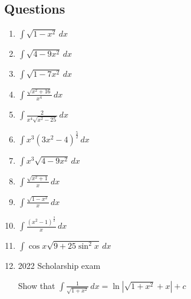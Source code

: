 \documentclass[../main.tex]{subfiles}
\begin{document}
    
\pagebreak

\subsection*{Questions}
\label{Trig substitution}
\begin{enumerate}
    \item 
    \(\int \sqrt{1-x^2}\,dx\)

    \item 
    \(\int \sqrt{4-9x^2}\,dx\)

    \item 
    \(\int \sqrt{1-7x^2}\,dx\)

    \item 
    \(\int \frac{\sqrt{x^2+16}}{x^4}\,dx\)

    \item 
    \(\int \frac{2}{x^4\sqrt{x^2-25}}\,dx\)

    \item 
    \(\int x^3(3x^2-4)^{\frac{5}{2}}\,dx\)

    \item 
    \(\int x^3\sqrt{4-9x^2}\,dx\)

    \item 
    \(\int \frac{\sqrt{x^2+1}}{x}\,dx\)

    \item 
    \(\int \frac{\sqrt{1-x^2}}{x}\,dx\)

    \item 
    \(\int \frac{(x^2-1)^{\frac{3}{2}}}{x}\,dx\)

    \item 
    \(\int \cos{x}\sqrt{9+25\sin^2{x}}\,dx\)

    \item 2022 Scholarship exam
    
    Show that \(\int \frac{1}{\sqrt{1+x^2}}\,dx=\ln{|\sqrt{1+x^2}+x|}+c\)
    
\end{enumerate}


\pagebreak
\end{document}
